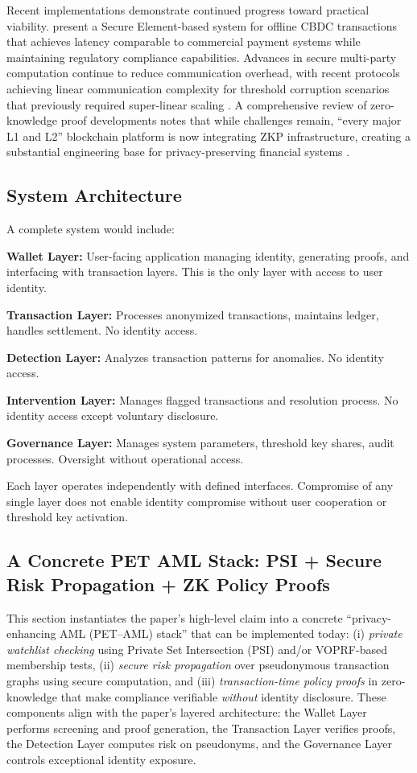 \documentclass[11pt]{article}
\begin{document}
Recent implementations demonstrate continued progress toward practical viability. \citet{OfflineCBDC2024} present a Secure Element-based system for offline CBDC transactions that achieves latency comparable to commercial payment systems while maintaining regulatory compliance capabilities. Advances in secure multi-party computation continue to reduce communication overhead, with recent protocols achieving linear communication complexity for threshold corruption scenarios that previously required super-linear scaling \citep{MPC2024}. A comprehensive review of zero-knowledge proof developments notes that while challenges remain, ``every major L1 and L2'' blockchain platform is now integrating ZKP infrastructure, creating a substantial engineering base for privacy-preserving financial systems \citep{ZKPSurvey2025}.

\subsection{System Architecture}

A complete system would include:

\textbf{Wallet Layer:} User-facing application managing identity, generating proofs, and interfacing with transaction layers. This is the only layer with access to user identity.

\textbf{Transaction Layer:} Processes anonymized transactions, maintains ledger, handles settlement. No identity access.

\textbf{Detection Layer:} Analyzes transaction patterns for anomalies. No identity access.

\textbf{Intervention Layer:} Manages flagged transactions and resolution process. No identity access except voluntary disclosure.

\textbf{Governance Layer:} Manages system parameters, threshold key shares, audit processes. Oversight without operational access.

Each layer operates independently with defined interfaces. Compromise of any single layer does not enable identity compromise without user cooperation or threshold key activation.

\subsection{A Concrete PET AML Stack: PSI + Secure Risk Propagation + ZK Policy Proofs}
\label{sec:pet-aml-stack}

This section instantiates the paper's high-level claim into a concrete ``privacy-enhancing AML (PET--AML) stack'' that can be implemented today: (i) \emph{private watchlist checking} using Private Set Intersection (PSI) and/or VOPRF-based membership tests, (ii) \emph{secure risk propagation} over pseudonymous transaction graphs using secure computation, and (iii) \emph{transaction-time policy proofs} in zero-knowledge that make compliance verifiable \emph{without} identity disclosure. These components align with the paper's layered architecture: the Wallet Layer performs screening and proof generation, the Transaction Layer verifies proofs, the Detection Layer computes risk on pseudonyms, and the Governance Layer controls exceptional identity exposure.
\end{document}
